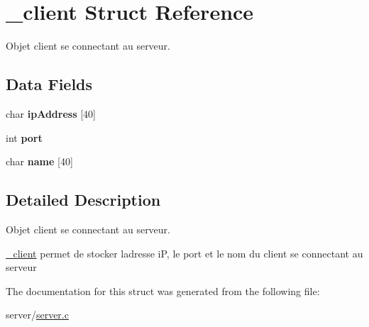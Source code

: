 \hypertarget{struct__client}{}\section{\+\_\+client Struct Reference}
\label{struct__client}


Objet client se connectant au serveur.  


\subsection*{Data Fields}
\begin{DoxyCompactItemize}
\item 
\mbox{\label{struct__client_a2b8a978883b4e9ef1fc6e749a68cf167}} 
char {\bfseries ip\+Address} \mbox{[}40\mbox{]}
\item 
\mbox{\label{struct__client_a12c53cb937dacdc171ee692a9c0149f1}} 
int {\bfseries port}
\item 
\mbox{\label{struct__client_a60624385d157f4f9802a1e2458da544f}} 
char {\bfseries name} \mbox{[}40\mbox{]}
\end{DoxyCompactItemize}


\subsection{Detailed Description}
Objet client se connectant au serveur. 

\mbox{\hyperlink{struct__client}{\+\_\+client}} permet de stocker l\textquotesingle{}adresse iP, le port et le nom du client se connectant au serveur 

The documentation for this struct was generated from the following file\+:\begin{DoxyCompactItemize}
\item 
server/\mbox{\hyperlink{server_8c}{server.\+c}}\end{DoxyCompactItemize}
